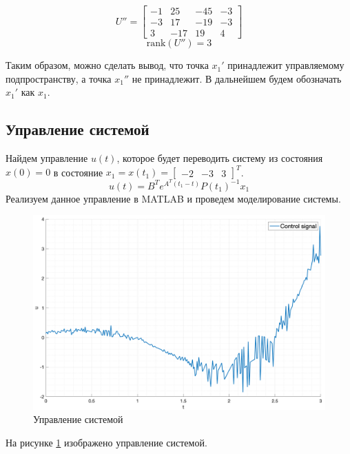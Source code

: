 \begin{equation}
   U'' = \begin{bmatrix}
        -1 & 25 & -45 & -3 \\
        -3 & 17 & -19 & -3 \\
        3 & -17 & 19 & 4
    \end{bmatrix}
\end{equation}
\begin{equation}
    \text{rank}(U'') = 3
\end{equation}

Таким образом, можно сделать вывод, что точка $x_1'$ принадлежит управляемому подпространству, а точка $x_1''$ не принадлежит. В дальнейшем будем обозначать $x_1'$ как $x_1$.

\subsection{Управление системой}
Найдем управление $u(t)$, которое будет переводить систему из состояния $x(0) = 0$ в состояние $x_1 = x(t_1) = \begin{bmatrix} -2 & -3 & 3 \end{bmatrix}^T$. 
\begin{equation}
    u(t) = B^Te^{A^T(t_1 - t)}P(t_1)^{-1}x_1
\end{equation}
Реализуем данное управление в MATLAB и проведем моделирование системы.  %
\begin{figure}
    \centering
    \includegraphics[width=\textwidth]{media/plots/task2_control_signal.png}
    \caption{Управление системой}
    \label{fig:task1_control_signal}
\end{figure}
На рисунке \ref{fig:task1_control_signal} изображено управление системой.
